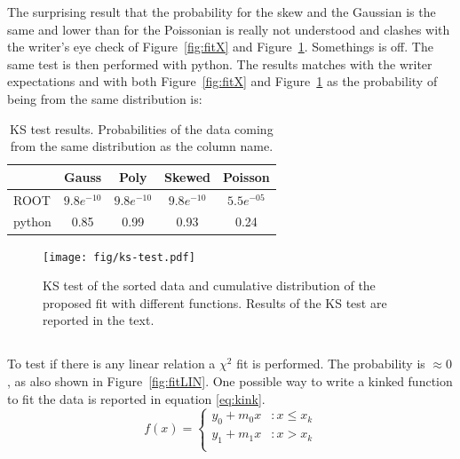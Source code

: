 \documentclass[twocolumn]{article}
\begin{document}
	The surprising result that the probability for the skew and the Gaussian is the same and lower than for the Poissonian is really not understood and clashes with the writer's eye check of Figure~\ref{fig:fitX} and Figure~\ref{fig:test}.
	Somethings is off. 
	The same test is then performed  with python. The results matches with the writer expectations and with  both Figure~\ref{fig:fitX} and Figure~\ref{fig:test} as the probability of being from the same distribution is:
	\begin{table}[tb]
		\caption{KS test results. Probabilities  of the data  coming from the same distribution as the column name.}
		\label{tab:tests}
		\begin{center}
			\begin{tabular}{l|cccc}
			\hline
	
			\hline
			\textbf{} & \textbf{Gauss} & \textbf{Poly} &  \textbf{Skewed} & \textbf{Poisson} \\
			\hline
			ROOT	& $9.8e^{-10 }$& $9.8e^{-10 }$  &  $9.8e^{-10 }$  & $5.5e^{-05}$ \\
			python	 & 0.85  & 0.99   & 0.93 & 0.24   \\
			\hline
	
			\hline
			\end{tabular}
		\end{center}
	\end{table}


	\begin{figure}[h!]
		\begin{center}
			\texttt{[image: fig/ks-test.pdf]}
		\end{center}
		\caption{KS test of the sorted data and cumulative distribution of the proposed fit with different functions. Results  of the KS test are reported in the text.}
		\label{fig:test}
	\end{figure}

\subsection{}
To test if there is any linear relation a $\chi^2$ fit is performed. The probability is $\approx 0 $, as also shown in Figure~\ref{fig:fitLIN}.
One possible way to write a kinked function to fit the data is reported in equation \ref{eq:kink}.
\begin{equation}
\label{eq:kink}
	  f(x) = \left\{
     \begin{array}{lr}
       y_0 + m_0 x  & : x \le x_k \\
       y_1 + m_1 x  & : x > x_k \\
     \end{array}
   \right.
\end{equation}
\end{document}
